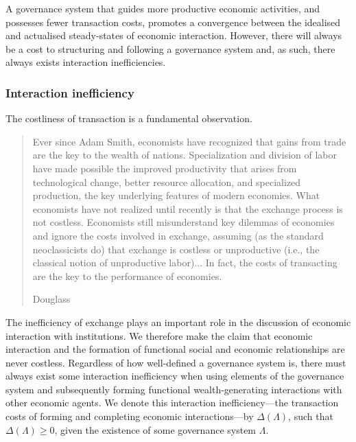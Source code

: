 A governance system that guides more productive economic activities, and possesses fewer transaction costs, promotes a convergence between the idealised and actualised steady-states of economic interaction. However, there will always be a cost to structuring and following a governance system and, as such, there always exists interaction inefficiencies.

\subsubsection{Interaction inefficiency}
\label{subsubsec:interactionInefficiency}

The costliness of transaction is a fundamental observation.

\begin{quote}
Ever since Adam Smith, economists have recognized that gains from trade are the key to the wealth of nations. Specialization and division of labor have made possible the improved productivity that arises from technological change, better resource allocation, and specialized production, the key underlying features of modern economies. What economists have not realized until recently is that the exchange process is not costless. Economists still misunderstand key dilemmas of economies and ignore the costs involved in exchange, assuming (as the standard neoclassicists do) that exchange is costless or unproductive (i.e., the classical notion of unproductive labor)... In fact, the costs of transacting are the key to the performance of economies.

\begin{flushright}
Douglass \citet[p.~1320]{North1989}
\end{flushright}
\end{quote}

The inefficiency of exchange plays an important role in the discussion of economic interaction with institutions. We therefore make the claim that economic interaction and the formation of functional social and economic relationships are never costless. Regardless of how well-defined a governance system is, there must always exist some interaction inefficiency when using elements of the governance system and subsequently forming functional wealth-generating interactions with other economic agents. We denote this interaction inefficiency---the transaction costs of forming and completing economic interactions---by $\Delta(\Lambda)$, such that $\Delta(\Lambda) \geqslant 0$, given the existence of some governance system $\Lambda$.

